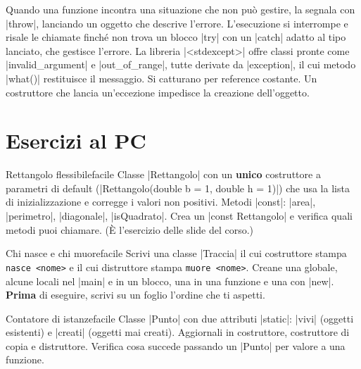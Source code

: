 \begin{orale}
Quando una funzione incontra una situazione che non può gestire, la segnala con
\cc|throw|, lanciando un oggetto che descrive l'errore. L'esecuzione si interrompe
e risale le chiamate finché non trova un blocco \cc|try| con un \cc|catch| adatto
al tipo lanciato, che gestisce l'errore. La libreria \cc|<stdexcept>| offre classi
pronte come \cc|invalid_argument| e \cc|out_of_range|, tutte derivate da
\cc|exception|, il cui metodo \cc|what()| restituisce il messaggio. Si catturano
per reference costante. Un costruttore che lancia un'eccezione impedisce la
creazione dell'oggetto.
\end{orale}

\section{Esercizi al PC}

\begin{esercizio}{Rettangolo flessibile}{facile}
Classe \cc|Rettangolo| con un \textbf{unico} costruttore a parametri di default
(\cc|Rettangolo(double b = 1, double h = 1)|) che usa la lista di inizializzazione e
corregge i valori non positivi. Metodi \cc|const|: \cc|area|, \cc|perimetro|,
\cc|diagonale|, \cc|isQuadrato|. Crea un \cc|const Rettangolo| e verifica quali
metodi puoi chiamare. (È l'esercizio delle slide del corso.)
\end{esercizio}

\begin{esercizio}{Chi nasce e chi muore}{facile}
Scrivi una classe \cc|Traccia| il cui costruttore stampa \texttt{nasce <nome>} e il
cui distruttore stampa \texttt{muore <nome>}. Creane una globale, alcune locali nel
\cc|main| e in un blocco, una in una funzione e una con \cc|new|. \textbf{Prima} di
eseguire, scrivi su un foglio l'ordine che ti aspetti.
\end{esercizio}

\begin{esercizio}{Contatore di istanze}{facile}
Classe \cc|Punto| con due attributi \cc|static|: \cc|vivi| (oggetti esistenti) e
\cc|creati| (oggetti mai creati). Aggiornali in costruttore, costruttore di copia e
distruttore. Verifica cosa succede passando un \cc|Punto| per valore a una funzione.
\end{esercizio}

